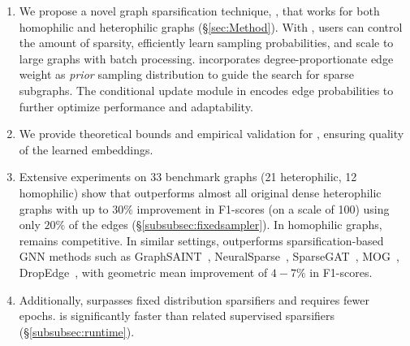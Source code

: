 \begin{enumerate}[wide, labelindent=2pt,itemsep=1pt,topsep=1pt]
    \item We propose a novel graph sparsification technique, \sgs, that works for both homophilic and heterophilic graphs (\S\ref{sec:Method}). With \sgs, users can control the amount of sparsity, efficiently learn sampling probabilities, and scale to large graphs with batch processing. \sgs incorporates degree-proportionate edge weight as \emph{prior} sampling distribution to guide the search for sparse subgraphs. 
    The conditional update module in \sgs encodes edge probabilities to further optimize performance and adaptability.

    \item We provide theoretical bounds and empirical validation for \sgs, ensuring quality of the learned embeddings.
    
    \item Extensive experiments on 33 benchmark graphs (21 heterophilic, 12 homophilic) show that \sgs outperforms almost all original dense heterophilic graphs with up to $30\%$ improvement in F1-scores (on a scale of 100) using only $20\%$ of the edges (\S\ref{subsubsec:fixedsampler}). In homophilic graphs, \sgs remains competitive. 
    In similar settings, \sgs outperforms sparsification-based GNN methods such as GraphSAINT~\cite{zeng2019graphsaint}, NeuralSparse~\cite{zheng2020robust}, SparseGAT~\cite{sparsegat}, MOG~\cite{zhang2024graph}, DropEdge~\cite{rong2019dropedge}, with geometric mean improvement of $4-7\%$  in F1-scores. 
    
    \item Additionally, \edgemlp surpasses fixed distribution sparsifiers and requires fewer epochs. \sgs is significantly faster than related supervised sparsifiers (\S\ref{subsubsec:runtime}).
\end{enumerate}